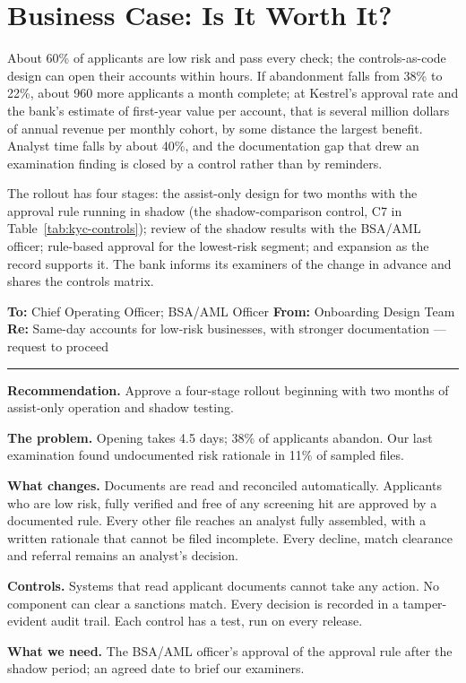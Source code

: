 \section{Business Case: Is It Worth It?}
\label{sec:kyc-business}

About 60\% of applicants are low risk and pass every check; the controls-as-code design can open their accounts within hours. If abandonment falls from 38\% to 22\%, about 960 more applicants a month complete; at Kestrel's approval rate and the bank's estimate of first-year value per account, that is several million dollars of annual revenue per monthly cohort, by some distance the largest benefit. Analyst time falls by about 40\%, and the documentation gap that drew an examination finding is closed by a control rather than by reminders.

The rollout has four stages: the assist-only design for two months with the approval rule running in shadow (the shadow-comparison control, C7 in Table~\ref{tab:kyc-controls}); review of the shadow results with the BSA/AML officer; rule-based approval for the lowest-risk segment; and expansion as the record supports it. The bank informs its examiners of the change in advance and shares the controls matrix.

\begin{tcolorbox}[colback=white, colframe=black!60, boxrule=0.6pt, arc=1pt, left=10pt, right=10pt, top=8pt, bottom=8pt, fontupper=\small]
\textbf{To:} Chief Operating Officer; BSA/AML Officer \hfill \textbf{From:} Onboarding Design Team\\
\textbf{Re:} Same-day accounts for low-risk businesses, with stronger documentation --- request to proceed

\smallskip\hrule\smallskip

\textbf{Recommendation.} Approve a four-stage rollout beginning with two months of assist-only operation and shadow testing.

\textbf{The problem.} Opening takes 4.5 days; 38\% of applicants abandon. Our last examination found undocumented risk rationale in 11\% of sampled files.

\textbf{What changes.} Documents are read and reconciled automatically. Applicants who are low risk, fully verified and free of any screening hit are approved by a documented rule. Every other file reaches an analyst fully assembled, with a written rationale that cannot be filed incomplete. Every decline, match clearance and referral remains an analyst's decision.

\textbf{Controls.} Systems that read applicant documents cannot take any action. No component can clear a sanctions match. Every decision is recorded in a tamper-evident audit trail. Each control has a test, run on every release.

\textbf{What we need.} The BSA/AML officer's approval of the approval rule after the shadow period; an agreed date to brief our examiners.
\end{tcolorbox}

